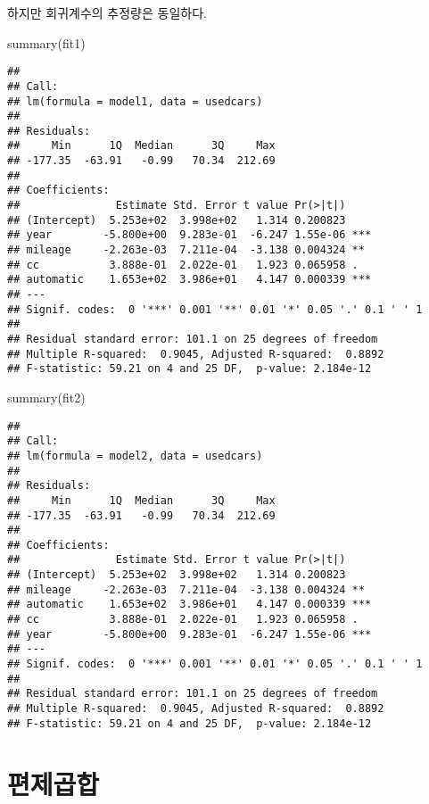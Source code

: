\documentclass[
]{book}
\newenvironment{Shaded}{\begin{snugshade}}{\end{snugshade}}
\newcommand{\FunctionTok}[1]{\textcolor[rgb]{0.00,0.00,0.00}{#1}}
\newcommand{\NormalTok}[1]{#1}
\begin{document}
하지만 회귀계수의 추정량은 동일하다.

\begin{Shaded}
\begin{Highlighting}[]
\FunctionTok{summary}\NormalTok{(fit1)}
\end{Highlighting}
\end{Shaded}

\begin{verbatim}
## 
## Call:
## lm(formula = model1, data = usedcars)
## 
## Residuals:
##     Min      1Q  Median      3Q     Max 
## -177.35  -63.91   -0.99   70.34  212.69 
## 
## Coefficients:
##               Estimate Std. Error t value Pr(>|t|)    
## (Intercept)  5.253e+02  3.998e+02   1.314 0.200823    
## year        -5.800e+00  9.283e-01  -6.247 1.55e-06 ***
## mileage     -2.263e-03  7.211e-04  -3.138 0.004324 ** 
## cc           3.888e-01  2.022e-01   1.923 0.065958 .  
## automatic    1.653e+02  3.986e+01   4.147 0.000339 ***
## ---
## Signif. codes:  0 '***' 0.001 '**' 0.01 '*' 0.05 '.' 0.1 ' ' 1
## 
## Residual standard error: 101.1 on 25 degrees of freedom
## Multiple R-squared:  0.9045, Adjusted R-squared:  0.8892 
## F-statistic: 59.21 on 4 and 25 DF,  p-value: 2.184e-12
\end{verbatim}

\begin{Shaded}
\begin{Highlighting}[]
\FunctionTok{summary}\NormalTok{(fit2)}
\end{Highlighting}
\end{Shaded}

\begin{verbatim}
## 
## Call:
## lm(formula = model2, data = usedcars)
## 
## Residuals:
##     Min      1Q  Median      3Q     Max 
## -177.35  -63.91   -0.99   70.34  212.69 
## 
## Coefficients:
##               Estimate Std. Error t value Pr(>|t|)    
## (Intercept)  5.253e+02  3.998e+02   1.314 0.200823    
## mileage     -2.263e-03  7.211e-04  -3.138 0.004324 ** 
## automatic    1.653e+02  3.986e+01   4.147 0.000339 ***
## cc           3.888e-01  2.022e-01   1.923 0.065958 .  
## year        -5.800e+00  9.283e-01  -6.247 1.55e-06 ***
## ---
## Signif. codes:  0 '***' 0.001 '**' 0.01 '*' 0.05 '.' 0.1 ' ' 1
## 
## Residual standard error: 101.1 on 25 degrees of freedom
## Multiple R-squared:  0.9045, Adjusted R-squared:  0.8892 
## F-statistic: 59.21 on 4 and 25 DF,  p-value: 2.184e-12
\end{verbatim}

\hypertarget{uxd3b8uxc81cuxacf1uxd569}{%
\section{편제곱합}\label{uxd3b8uxc81cuxacf1uxd569}}
\end{document}
